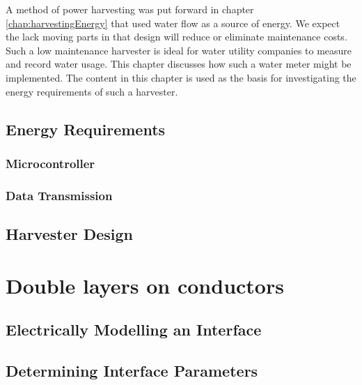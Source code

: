         A method of power harvesting was put forward in chapter \ref{chap:harvestingEnergy} that used water flow as a source of energy.
        We expect the lack moving parts in that design will reduce or eliminate maintenance costs.
        Such a low maintenance harvester is ideal for water utility companies to measure and record water usage.
        This chapter discusses how such a water meter might be implemented.
        The content in this chapter is used as the basis for investigating the energy requirements of such a harvester.

        

    \chapter{Energy Requirements}
        \label{chap:energyRequirements}
        
        \section{Microcontroller}
            
        
        \section{Data Transmission}
            

    \chapter{Harvester Design}
        \label{chap:harvesterDesign}
        

\part{\label{part:doubleLayersOnConductors}Double layers on conductors}
    \chapter{Electrically Modelling an Interface}
        
    \chapter{Determining Interface Parameters}
        


